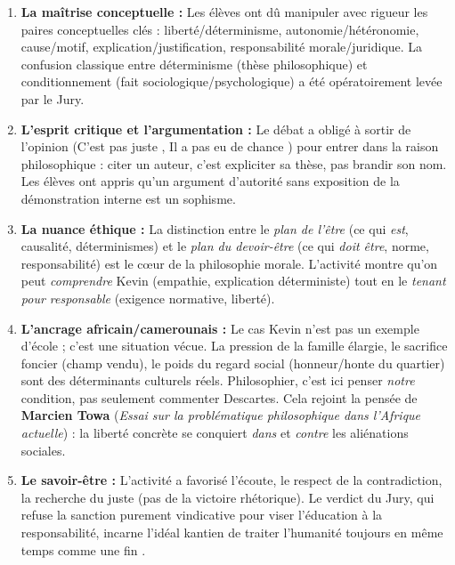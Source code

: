 \documentclass[11pt]{article}
\newcommand{\cle}[1]{{\popxbold\color{popdark}#1}}
\begin{document}
\begin{enumerate}
    \item \textbf{La maîtrise conceptuelle :} Les élèves ont dû manipuler avec rigueur les paires conceptuelles clés : \cle{liberté/déterminisme}, \cle{autonomie/hétéronomie}, \cle{cause/motif}, \cle{explication/justification}, \cle{responsabilité morale/juridique}. La confusion classique entre \guillemotleft déterminisme \guillemotright (thèse philosophique) et \guillemotleft conditionnement \guillemotright (fait sociologique/psychologique) a été opératoirement levée par le Jury.
    \item \textbf{L'esprit critique et l'argumentation :} Le débat a obligé à sortir de l'opinion (\guillemotleft C'est pas juste \guillemotright, \guillemotleft Il a pas eu de chance \guillemotright) pour entrer dans la \cle{raison philosophique} : citer un auteur, c'est expliciter sa thèse, pas brandir son nom. Les élèves ont appris qu'un argument d'autorité sans exposition de la démonstration interne est un sophisme.
    \item \textbf{La nuance éthique :} La distinction entre le \emph{plan de l'être} (ce qui \emph{est}, causalité, déterminismes) et le \emph{plan du devoir-être} (ce qui \emph{doit être}, norme, responsabilité) est le cœur de la philosophie morale. L'activité montre qu'on peut \emph{comprendre} Kevin (empathie, explication déterministe) tout en le \emph{tenant pour responsable} (exigence normative, liberté).
    \item \textbf{L'ancrage africain/camerounais :} Le cas Kevin n'est pas un exemple d'école ; c'est une \cle{situation vécue}. La \cle{pression de la famille élargie}, le \cle{sacrifice foncier} (champ vendu), le \cle{poids du regard social} (honneur/honte du quartier) sont des déterminants culturels réels. Philosophier, c'est ici penser \emph{notre} condition, pas seulement commenter Descartes. Cela rejoint la pensée de \textbf{Marcien Towa} (\emph{Essai sur la problématique philosophique dans l'Afrique actuelle}) : la liberté concrète se conquiert \emph{dans} et \emph{contre} les aliénations sociales.
    \item \textbf{Le savoir-être :} L'activité a favorisé l'\cle{écoute}, le \cle{respect de la contradiction}, la \cle{recherche du juste} (pas de la victoire rhétorique). Le verdict du Jury, qui refuse la sanction purement vindicative pour viser l'éducation à la responsabilité, incarne l'idéal kantien de traiter l'humanité \guillemotleft toujours en même temps comme une fin \guillemotright.
\end{enumerate}
\end{document}
